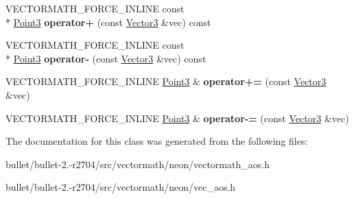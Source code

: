 \begin{DoxyCompactItemize}
\item 
\hypertarget{class_vectormath_1_1_aos_1_1_point3_a822cd3a829b3fd1a6e457c0333cb23eb}{V\+E\+C\+T\+O\+R\+M\+A\+T\+H\+\_\+\+F\+O\+R\+C\+E\+\_\+\+I\+N\+L\+I\+N\+E const \\*
\hyperlink{class_vectormath_1_1_aos_1_1_point3}{Point3} {\bfseries operator+} (const \hyperlink{class_vectormath_1_1_aos_1_1_vector3}{Vector3} \&vec) const }\label{class_vectormath_1_1_aos_1_1_point3_a822cd3a829b3fd1a6e457c0333cb23eb}

\item 
\hypertarget{class_vectormath_1_1_aos_1_1_point3_a81ca0dfae7913f622704da3ce1df35f6}{V\+E\+C\+T\+O\+R\+M\+A\+T\+H\+\_\+\+F\+O\+R\+C\+E\+\_\+\+I\+N\+L\+I\+N\+E const \\*
\hyperlink{class_vectormath_1_1_aos_1_1_point3}{Point3} {\bfseries operator-\/} (const \hyperlink{class_vectormath_1_1_aos_1_1_vector3}{Vector3} \&vec) const }\label{class_vectormath_1_1_aos_1_1_point3_a81ca0dfae7913f622704da3ce1df35f6}

\item 
\hypertarget{class_vectormath_1_1_aos_1_1_point3_a2664dac684d9760df08aa1ac58f7179c}{V\+E\+C\+T\+O\+R\+M\+A\+T\+H\+\_\+\+F\+O\+R\+C\+E\+\_\+\+I\+N\+L\+I\+N\+E \hyperlink{class_vectormath_1_1_aos_1_1_point3}{Point3} \& {\bfseries operator+=} (const \hyperlink{class_vectormath_1_1_aos_1_1_vector3}{Vector3} \&vec)}\label{class_vectormath_1_1_aos_1_1_point3_a2664dac684d9760df08aa1ac58f7179c}

\item 
\hypertarget{class_vectormath_1_1_aos_1_1_point3_a997776eba517a8f237f5f0e3c48890e1}{V\+E\+C\+T\+O\+R\+M\+A\+T\+H\+\_\+\+F\+O\+R\+C\+E\+\_\+\+I\+N\+L\+I\+N\+E \hyperlink{class_vectormath_1_1_aos_1_1_point3}{Point3} \& {\bfseries operator-\/=} (const \hyperlink{class_vectormath_1_1_aos_1_1_vector3}{Vector3} \&vec)}\label{class_vectormath_1_1_aos_1_1_point3_a997776eba517a8f237f5f0e3c48890e1}

\end{DoxyCompactItemize}


The documentation for this class was generated from the following files\+:\begin{DoxyCompactItemize}
\item 
bullet/bullet-\/2.-\/r2704/src/vectormath/neon/vectormath\+\_\+aos.\+h\item 
bullet/bullet-\/2.-\/r2704/src/vectormath/neon/vec\+\_\+aos.\+h\end{DoxyCompactItemize}
